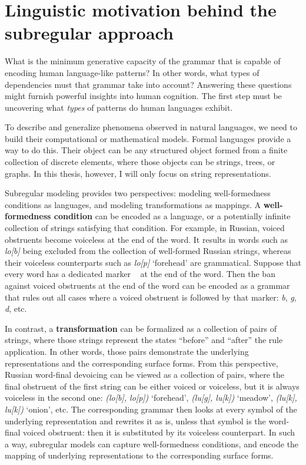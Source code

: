 \section{Linguistic motivation behind the subregular approach}

What is the minimum generative capacity of the grammar that is capable of encoding human language-like patterns?
In other words, what types of dependencies must that grammar take into account?
Answering these questions might furnish powerful insights into human cognition.
The first step must be uncovering what \emph{types} of patterns do human languages exhibit.


To describe and generalize phenomena observed in natural languages, we need to build their computational or mathematical models.
Formal languages provide a way to do this.
Their object can be any structured object formed from a finite collection of discrete elements, where those objects can be strings, trees, or graphs.
In this thesis, however, I will only focus on string representations.


Subregular modeling provides two perspectives: modeling well-formedness conditions as languages, and modeling transformations as mappings.
A \textbf{well-formedness condition} can be encoded as a language, or a potentially infinite collection of strings satisfying that condition.
For example, in Russian, voiced obstruents become voiceless at the end of the word.
It results in words such as \emph{lo[b]} being excluded from the collection of well-formed Russian strings, whereas their voiceless counterparts such as \emph{lo[p]} `forehead' are grammatical.
Suppose that every word has a dedicated marker \eow~ at the end of the word.
Then the ban against voiced obstruents at the end of the word can be encoded as a grammar that rules out all cases where a voiced obstruent is followed by that marker: \emph{b\eow}, \emph{g\eow}, \emph{d\eow}, etc.


In contrast, a \textbf{transformation} can be formalized as a collection of pairs of strings, where those strings represent the states ``before'' and ``after'' the rule application.
In other words, those pairs demonstrate the underlying representations and the corresponding surface forms.
From this perspective, Russian word-final devoicing can be viewed as a collection of pairs, where the final obstruent of the first string can be either voiced or voiceless, but it is always voiceless in the second one: \emph{(lo[b], lo[p])} `forehead', \emph{(lu[g], lu[k])} `meadow', \emph{(lu[k], lu[k])} `onion', etc.
The corresponding grammar then looks at every symbol of the underlying representation and rewrites it as is, unless that symbol is the word-final voiced obstruent: then it is substituted by its voiceless counterpart.
In such a way, subregular models can capture well-formedness conditions, and encode the mapping of underlying representations to the corresponding surface forms.


